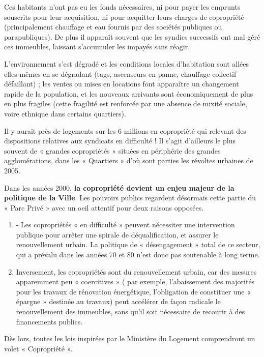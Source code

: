 				Ces habitants n’ont pas eu les fonds nécessaires, ni pour payer les emprunts souscrits pour leur acquisition, ni pour acquitter leurs charges de copropriété (principalement chauffage et eau fournis par des sociétés publiques ou parapubliques). De plus il apparaît souvent que les syndics successifs ont mal géré ces immeubles, laissant s’accumuler les impayés sans réagir.
				
				L’environnement s’est dégradé et les conditions locales d’habitation sont allées elles-mêmes en se dégradant (tags, ascenseurs en panne, chauffage collectif défaillant) ; les ventes ou mises en locations font apparaître un changement rapide de la population, et les nouveaux arrivants sont économiquement de plus en plus fragiles (cette fragilité est renforcée par une absence de mixité sociale, voire ethnique dans certains quartiers).
				
				Il y aurait près de  logements sur les 6 millions en copropriété qui relevant des dispositions relatives aux syndicats en difficulté ! Il s’agit d’ailleurs le plus souvent de « grandes copropriétés » situées en périphérie des grandes agglomérations, dans les « Quartiers » d’où sont parties les révoltes urbaines de 2005.
				
				Dans les années 2000, \textbf{la copropriété devient un enjeu majeur de la politique de la Ville}. Les pouvoirs publics regardent désormais cette partie du « Parc Privé » avec un oeil attentif pour deux raisons opposées.
				\begin{enumerate}
					\item - Les copropriétés « en difficulté » peuvent nécessiter une intervention publique pour arrêter une spirale de déqualification, et assurer le renouvellement urbain. La politique de « désengagement » total de ce secteur, qui a prévalu dans les années 70 et 80 n’est donc pas soutenable à long terme.
					
					\item Inversement, les copropriétés sont du renouvellement urbain, car des mesures apparemment peu « coercitives » ( par exemple, l’abaissement des majorités pour les travaux de rénovation énergétique, l’obligation de constituer une « épargne » destinée au travaux) peut accélérer de façon radicale le renouvellement des immeubles, sans qu’il soit nécessaire de recourir à des financements publics.
				\end{enumerate}
				
				Dès lors, toutes les lois inspirées par le Ministère du Logement comprendront un volet « Copropriété ».
				
